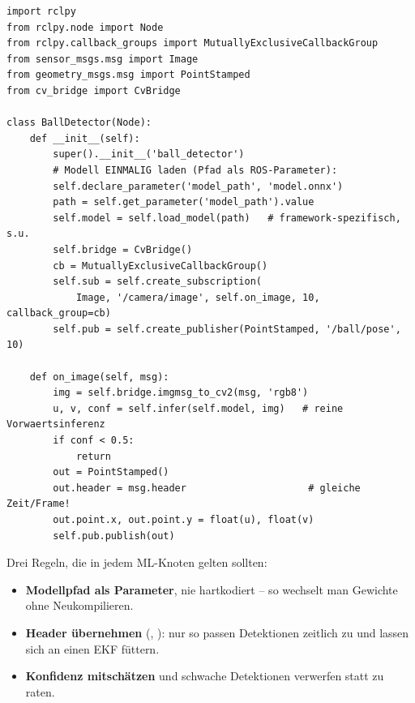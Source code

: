 \begin{lstlisting}[style=py,caption={Grundgerüst eines Inferenz-Knotens (framework-agnostisch)}]
import rclpy
from rclpy.node import Node
from rclpy.callback_groups import MutuallyExclusiveCallbackGroup
from sensor_msgs.msg import Image
from geometry_msgs.msg import PointStamped
from cv_bridge import CvBridge

class BallDetector(Node):
    def __init__(self):
        super().__init__('ball_detector')
        # Modell EINMALIG laden (Pfad als ROS-Parameter):
        self.declare_parameter('model_path', 'model.onnx')
        path = self.get_parameter('model_path').value
        self.model = self.load_model(path)   # framework-spezifisch, s.u.
        self.bridge = CvBridge()
        cb = MutuallyExclusiveCallbackGroup()
        self.sub = self.create_subscription(
            Image, '/camera/image', self.on_image, 10, callback_group=cb)
        self.pub = self.create_publisher(PointStamped, '/ball/pose', 10)

    def on_image(self, msg):
        img = self.bridge.imgmsg_to_cv2(msg, 'rgb8')
        u, v, conf = self.infer(self.model, img)   # reine Vorwaertsinferenz
        if conf < 0.5:
            return
        out = PointStamped()
        out.header = msg.header                     # gleiche Zeit/Frame!
        out.point.x, out.point.y = float(u), float(v)
        self.pub.publish(out)
\end{lstlisting}

\noindent Drei Regeln, die in jedem ML-Knoten gelten sollten:
\begin{itemize}
\item \textbf{Modellpfad als Parameter}, nie hartkodiert -- so wechselt man
  Gewichte ohne Neukompilieren.
\item \textbf{Header übernehmen} (, ): nur so passen
  Detektionen zeitlich zu  und lassen sich an einen EKF füttern.
\item \textbf{Konfidenz mitschätzen} und schwache Detektionen verwerfen statt zu
  raten.
\end{itemize}

